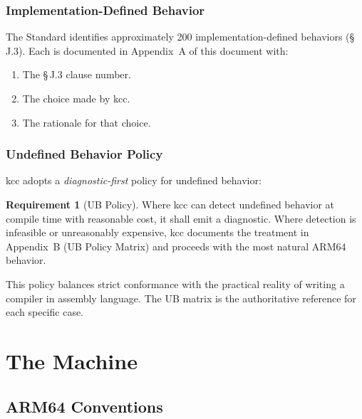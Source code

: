 \documentclass[11pt,a4paper,twoside,openright,DIV=15]{scrbook}
\theoremstyle{definition}
\newtheorem{requirement}{Requirement}[chapter]
\theoremstyle{plain}
\theoremstyle{remark}
\newcommand{\stdref}[1]{\S\,#1}
\newcommand{\kcc}{\textsf{kcc}}
\begin{document}
\section{Implementation-Defined Behavior}

The Standard identifies approximately 200 implementation-defined
behaviors (\stdref{J.3}).  Each is documented in Appendix~A of this
document with:

\begin{enumerate}
\item The \stdref{J.3} clause number.
\item The choice made by \kcc{}.
\item The rationale for that choice.
\end{enumerate}

\section{Undefined Behavior Policy}

\kcc{} adopts a \emph{diagnostic-first} policy for undefined behavior:

\begin{requirement}[UB Policy]
Where \kcc{} can detect undefined behavior at compile time with
reasonable cost, it shall emit a diagnostic.  Where detection is
infeasible or unreasonably expensive, \kcc{} documents the treatment
in Appendix~B (UB Policy Matrix) and proceeds with the most natural
ARM64 behavior.
\end{requirement}

This policy balances strict conformance with the practical reality
of writing a compiler in assembly language.  The UB matrix is the
authoritative reference for each specific case.

\part{The Machine}

%

\chapter{ARM64 Conventions}
\label{ch:arm64-conventions}
\end{document}
